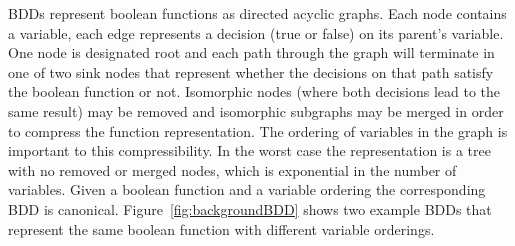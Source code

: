 BDDs represent boolean functions as directed acyclic graphs. Each node contains a variable, each edge represents a decision (true or false) on its parent's variable. One node is designated root and each path through the graph will terminate in one of two sink nodes that represent whether the decisions on that path satisfy the boolean function or not. Isomorphic nodes (where both decisions lead to the same result) may be removed and isomorphic subgraphs may be merged in order to compress the function representation. The ordering of variables in the graph is important to this compressibility. In the worst case the representation is a tree with no removed or merged nodes, which is exponential in the number of variables. Given a boolean function and a variable ordering the corresponding BDD is canonical. Figure~\ref{fig:backgroundBDD} shows two example BDDs that represent the same boolean function with different variable orderings.

